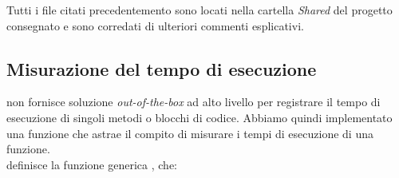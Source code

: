 \noindent Tutti i file citati precedentemento sono locati nella
cartella \textit{Shared} del progetto consegnato e sono corredati di
ulteriori commenti esplicativi.



\subsection{Misurazione del tempo di esecuzione}
\label{sub:stopwatch}

\noindent {} non fornisce soluzione
\textit{out-of-the-box} ad alto livello per registrare il tempo di
esecuzione di singoli metodi o blocchi di codice. Abbiamo quindi
implementato una funzione  che astrae il compito
di misurare i tempi di esecuzione di una funzione. \\

\noindent {} definisce la
funzione generica , che:

